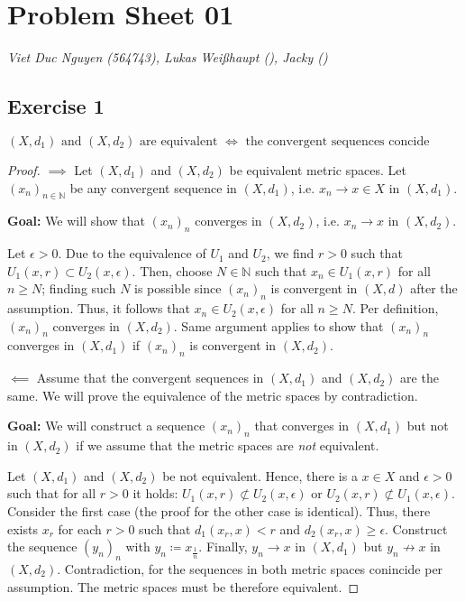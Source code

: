 \documentclass[a4paper]{article}
\renewcommand{\hline}{\noindent\makebox[\linewidth]{\rule{12cm}{1pt}}}
\begin{document}
\section*{Problem Sheet 01}
\textit{Viet Duc Nguyen (564743), Lukas Weißhaupt (), Jacky ()}


\hline 

\subsection*{Exercise 1}
\begin{issue}{}{}
$(X,d_1) \text{ and } (X,d_2) \text{ are equivalent } \iff \text{ the convergent sequences concide}$
\end{issue}
\begin{proof}
$\implies$ Let $(X,d_1)$ and $(X,d_2)$ be equivalent metric spaces. Let $(x_n)_{n \in \mathbb N}$ be any convergent sequence in $(X,d_1)$, i.e. $x_n \to x \in X$ in $(X,d_1)$.

\textbf{Goal:} We will show that $(x_n)_n$ converges in $(X,d_2)$, i.e. $x_n \to x$ in $(X,d_2)$.

Let $\epsilon > 0$. Due to the equivalence of $U_1$ and $U_2$, we find $r > 0$ such that $U_1(x,r) \subset U_2(x,\epsilon)$. Then, choose $N \in \mathbb N$ such that $x_n \in U_1(x, r)$ for all $n \geq N$; finding such $N$ is possible since $(x_n)_n$ is convergent in $(X,d)$ after the assumption. Thus, it follows that $x_n \in U_2(x, \epsilon)$ for all $n \geq N$. Per definition, $(x_n)_n$ converges in $(X,d_2)$. Same argument applies to show that $(x_n)_n$ converges in $(X,d_1)$ if  $(x_n)_n$ is convergent in $(X,d_2)$.

$\impliedby$ Assume that the convergent sequences in $(X,d_1)$ and $(X,d_2)$ are the same. We will prove the equivalence of the metric spaces by contradiction.

\textbf{Goal:} We will construct a sequence $(x_n)_n$ that converges in $(X,d_1)$ but not in $(X,d_2)$ if we assume that the metric spaces are \emph{not} equivalent. 

Let $(X,d_1)$ and $(X,d_2)$ be not equivalent. Hence, there is a $x\in X$ and $\epsilon > 0$ such that for all $r > 0$ it holds: $U_1(x,r) \not \subset U_2(x, \epsilon)$ or $U_2(x,r) \not \subset U_1(x, \epsilon)$. Consider the first case (the proof for the other case is identical). Thus, there exists $x_r$ for each $r > 0$ such that $d_1(x_r,x) < r$ and $d_2(x_r,x) \geq \epsilon$. Construct the sequence $(y_n)_n$ with $y_n \coloneqq x_{\frac{1}{n}}$. Finally, $y_n \to x$ in $(X,d_1)$ but $y_n \not \to x$ in $(X,d_2)$. Contradiction, for the sequences in both metric spaces conincide per assumption. The metric spaces must be therefore equivalent.
\end{proof}
\end{document}
